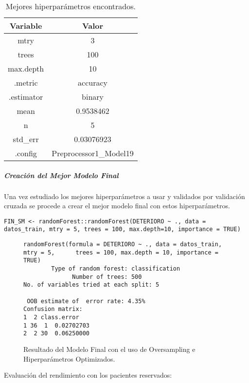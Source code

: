\begin{table}[H]
    \centering
    \begin{tabular}{|c|c|}
        \hline
        \textbf{Variable} & \textbf{Valor} \\
        \hline
        mtry & 3 \\
        trees & 100 \\
        max.depth & 10 \\
        .metric & accuracy \\
        .estimator & binary \\
        mean & 0.9538462 \\
        n & 5 \\
        std\_err & 0.03076923 \\
        .config & Preprocessor1\_Model19 \\
        \hline
    \end{tabular}
    \caption{Mejores hiperparámetros encontrados.}
    \label{tabla:mejores_hiperparametros}
\end{table}

\newpage
\subparagraph{Creación del Mejor Modelo Final}

Una vez estudiado los mejores hiperparámetros a usar y validados por validación cruzada se procede a crear el mejor modelo final con estos hiperparámetros.

\begin{lstlisting}[style=mystyle]
    FIN_SM <- randomForest::randomForest(DETERIORO ~ ., data = datos_train, mtry = 5, trees = 100, max.depth=10, importance = TRUE)
\end{lstlisting}

\begin{figure}[H]
    \centering
    \begin{lstlisting}[frame=single, basicstyle=\small\ttfamily]
randomForest(formula = DETERIORO ~ ., data = datos_train, mtry = 5,      trees = 100, max.depth = 10, importance = TRUE) 
        Type of random forest: classification
              Number of trees: 500
No. of variables tried at each split: 5

 OOB estimate of  error rate: 4.35%
Confusion matrix:
1  2 class.error
1 36  1  0.02702703
2  2 30  0.06250000
    \end{lstlisting}
    \caption{Resultado del Modelo Final con el uso de Oversampling e Hiperparámetros Optimizados.}
    \label{fig:random_forest_FINAL_SMOTE_HIPER}
\end{figure}

Evaluación del rendimiento con los pacientes reservados: 

